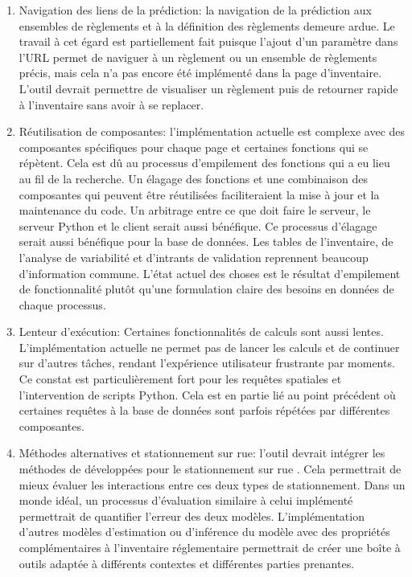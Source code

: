 \begin{enumerate}
            \item Navigation des liens de la prédiction: la navigation de la prédiction aux ensembles de règlements et à la définition des règlements demeure  ardue. Le travail à cet égard est partiellement fait puisque l'ajout d'un paramètre dans l'URL permet de naviguer à un règlement ou un ensemble de règlements précis, mais cela n'a pas encore été implémenté dans la page d'inventaire. L'outil devrait permettre de visualiser un règlement puis de retourner rapide à l'inventaire sans avoir à se replacer.
            \item Réutilisation de composantes: l'implémentation actuelle est complexe avec des composantes spécifiques pour chaque page et certaines fonctions qui se répètent. Cela est dû au processus d'empilement des fonctions qui a eu lieu au fil de la recherche. Un élagage des fonctions et une combinaison des composantes qui peuvent être réutilisées faciliteraient la mise à jour et la maintenance du code. Un arbitrage entre ce que doit faire le serveur, le serveur Python et le client serait aussi bénéfique. Ce processus d'élagage serait aussi bénéfique pour la base de données. Les tables de l'inventaire, de l'analyse de variabilité et d'intrants de validation reprennent beaucoup d'information commune. L'état actuel des choses est le résultat d'empilement de fonctionnalité plutôt qu'une formulation claire des besoins en données de chaque processus.
            \item Lenteur d'exécution: Certaines fonctionnalités de calculs sont aussi lentes. L'implémentation actuelle ne permet pas de lancer les calculs et de continuer sur d'autres tâches, rendant l'expérience utilisateur frustrante par moments. Ce constat est particulièrement fort pour les requêtes spatiales et l'intervention de scripts Python. Cela est en partie lié au point précédent où certaines requêtes à la base de données sont parfois répétées par différentes composantes.
            \item Méthodes alternatives et stationnement sur rue: l'outil devrait intégrer les méthodes de \citeauthor{bourdeau_methodologie_2014} développées pour le stationnement sur rue \parencite{morency_developpement_2022,bourdeau_methodologie_2014}. Cela permettrait de mieux évaluer les interactions entre ces deux types de stationnement. Dans un monde idéal, un processus d'évaluation similaire à celui implémenté permettrait de quantifier l'erreur des deux modèles. L'implémentation d'autres modèles d'estimation ou d'inférence du modèle avec des propriétés complémentaires à l'inventaire réglementaire permettrait de créer une boîte à outils adaptée à différents contextes et différentes parties prenantes. 

\end{enumerate}
